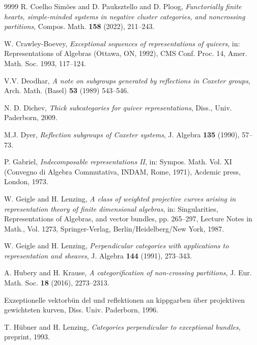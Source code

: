\documentclass[a4paper, 11pt, reqno]{amsart}
\numberwithin{equation}{section}
\theoremstyle{remark}
\theoremstyle{definition}
\begin{document}
\begin{thebibliography}{9999}
    {\sc R. Coelho Sim{\~o}es and D. Pauksztello and D. Ploog}, {\em Functorially finite hearts, simple-minded systems in negative cluster categories, and noncrossing partitions}, Compos. Math. {\bf 158} (2022), 211--243.

    {\sc W. Crawley-Boevey}, {\em Exceptional sequences of representations of quivers}, in: Representations of Algebras (Ottawa, ON, 1992), CMS Conf. Proc. 14, Amer. Math. Soc. 1993, 117--124.

    {\sc V.V. Deodhar}, {\em A note on subgroups generated by reflections in {C}oxeter groups}, Arch. Math. (Basel) {\bf 53} (1989) 543--546.

    {\sc N. D. Dichev}, {\em Thick subcategories for quiver representations}, Diss., Univ. Paderborn, 2009.

    {\sc M.J. Dyer}, {\em Reflection subgroups of Coxeter systems}, J. Algebra {\bf 135} (1990), 57--73.

    {\sc P. Gabriel}, {\em Indecomposable representations {I}{I}}, in: Sympos. Math. Vol. XI (Convegno di Algebra Commutativa, INDAM, Rome, 1971), Acdemic press, London, 1973.

    {\sc W. Geigle and H. Lenzing}, {\em A class of weighted projective curves arising in representation theory of finite dimensional algebras}, in: Singularities, Representations of Algebras, and vector bundles, pp. 265--297, Lecture Notes in Math., Vol. 1273, Springer-Verlag, Berlin/Heidelberg/New York, 1987.

    {\sc W. Geigle and H. Lenzing}, {\em Perpendicular categories with applications to representation and sheaves}, J. Algebra {\bf 144} (1991), 273--343.


    {\sc A. Hubery and H. Krause}, {\em A categorification of non-crossing partitions}, J. Eur. Math. Soc. {\bf 18} (2016), 2273--2313.

    {\sc Exzeptionelle vektorb{\"u}n del und reflektionen an kippgarben {\"u}ber projektiven gewichteten kurven}, Diss. Univ. Paderborn, 1996.

    {\sc T. H{\"u}bner and H. Lenzing}, {\em Categories perpendicular to exceptional bundles}, preprint, 1993.


\end{thebibliography}
\end{document}

